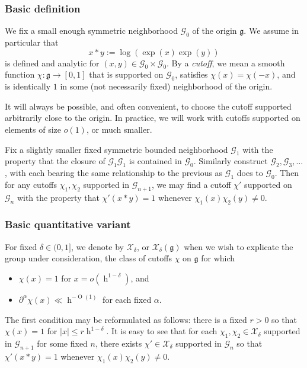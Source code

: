 \documentclass[reqno]{amsart}
\DeclareMathOperator{\h}{h}
\def\O{\operatorname{O}}
\theoremstyle{plain} \newtheorem{theorem} {Theorem}
\theoremstyle{definition} \newtheorem{definition} [theorem] {Definition}
\theoremstyle{itplain} %
\numberwithin{equation}{section}
\numberwithin{theorem}{section}
\renewcommand{\leq}{\leqslant}
\begin{document}
\subsubsection{Basic definition}
We fix a small enough symmetric neighborhood $\mathcal{G}_0$ of the origin $\mathfrak{g}$.  We assume in particular that
\begin{equation*}
  x \ast y := \log(\exp(x) \exp(y))
\end{equation*}
is defined and analytic for $(x,y) \in \mathcal{G}_0 \times \mathcal{G}_0$.  By a  \emph{cutoff}, we mean a smooth function $\chi : \mathfrak{g} \rightarrow [0,1]$ that is supported on $\mathcal{G}_0$, satisfies $\chi(x) = \chi(-x)$, and is identically $1$ in some (not necessarily fixed) neighborhood of the origin.

It will always be possible, and often convenient, to choose the cutoff supported arbitrarily close to the origin.  In practice, we will work with cutoffs supported on elements of size $o(1)$, or much smaller.

Fix a slightly smaller fixed symmetric bounded neighborhood $\mathcal{G}_1$ with the property that the closure of $\mathcal{G}_1 \mathcal{G}_1$ is contained in $\mathcal{G}_0$.  Similarly construct $\mathcal{G}_2, \mathcal{G}_3, \dotsc$, with each bearing the same relationship to the previous as $\mathcal{G}_1$ does to $\mathcal{G}_0$.  Then for any cutoffs $\chi_1, \chi_2$ supported in $\mathcal{G}_{n+1}$, we may find a cutoff $\chi '$ supported on $\mathcal{G}_n$ with the property that $\chi ' (x \ast y) = 1$ whenever $\chi_1(x) \chi_2(y) \neq 0$.


\subsubsection{Basic quantitative variant}
For fixed $\delta \in (0, 1]$, we denote by $\mathcal{X}_{\delta}$, or $\mathcal{X}_\delta(\mathfrak{g})$ when we wish to explicate the group under consideration, the class of cutoffs $\chi$ on $\mathfrak{g}$  for which
\begin{itemize}
\item $\chi(x) = 1$ for $x = o(\h^{1 - \delta})$, and
\item $\partial^{\alpha} \chi(x) \ll \h^{-\O(1)}$ for each fixed $\alpha$.
\end{itemize}
The first condition may be reformulated as follows: there is a fixed $r > 0$ so that $\chi(x) = 1$ for $|x| \leq r \h^{1 - \delta}$.  It is easy to see that for each $\chi_1, \chi_2 \in \mathcal{X}_{\delta}$ supported in $\mathcal{G}_{n+1}$ for some fixed $n$, there exists $\chi ' \in \mathcal{X}_{\delta}$ supported in $\mathcal{G}_n$ so that $\chi '(x \ast y) = 1$ whenever $\chi_1(x) \chi_2(y) \neq 0$.
\end{document}
